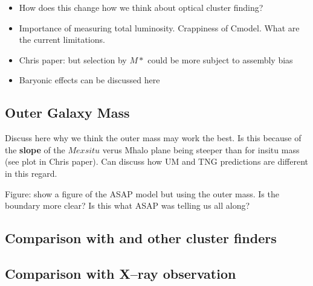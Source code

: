 \documentclass[a4paper,fleqn,usenatbib]{mnras}
\begin{document}
    \begin{itemize}
        \item How does this change how we think about optical cluster finding?
        \item Importance of measuring total luminosity. Crappiness of Cmodel. What are the current limitations.
        \item Chris paper: but selection by $M*$ could be more subject to assembly bias
        \item Baryonic effects can be discussed here
    \end{itemize}


\subsection{Outer Galaxy Mass}

Discuss here why we think the outer mass may work the best. Is this because of the \textbf{slope}
of the $Mexsitu$ verus Mhalo plane being steeper than for insitu mass (see plot in Chris paper).
Can discuss how UM and TNG predictions are different in this regard.

Figure: show a figure of the ASAP model but using the outer mass. Is the boundary more clear? Is
this what ASAP was telling us all along?

\subsection{Comparison with \redm{} and other cluster finders}
    \label{sec:richness}

    
\subsection{Comparison with X--ray observation}
    \label{sec:xray}
\end{document}
